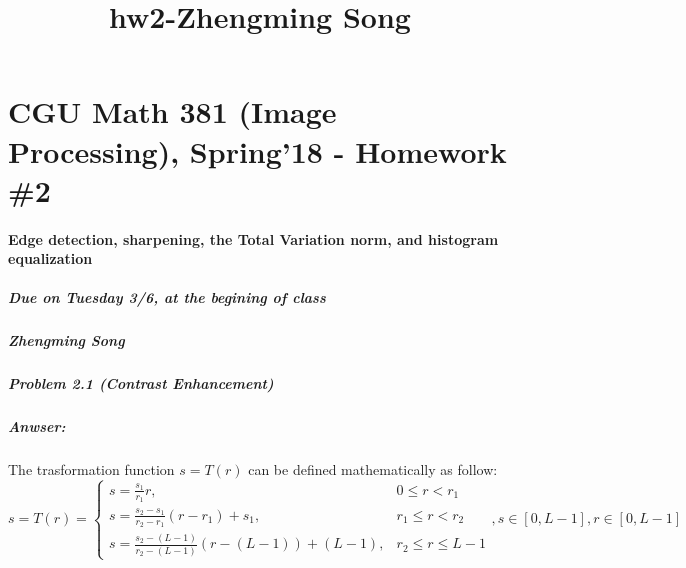 \documentclass[11pt]{article}
\title{hw2-Zhengming Song}
\begin{document}
    
    
    \maketitle
    
    

    
    \section{CGU Math 381 (Image Processing), Spring'18 - Homework
\#2}\label{cgu-math-381-image-processing-spring18---homework-2}

\paragraph{Edge detection, sharpening, the Total Variation norm, and
histogram
equalization}\label{edge-detection-sharpening-the-total-variation-norm-and-histogram-equalization}

\subparagraph{Due on Tuesday 3/6, at the begining of
class}\label{due-on-tuesday-36-at-the-begining-of-class}

\subparagraph{Zhengming Song}\label{zhengming-song}

    \subparagraph{\texorpdfstring{\textbf{Problem 2.1} (Contrast
Enhancement)}{Problem 2.1 (Contrast Enhancement)}}\label{problem-2.1-contrast-enhancement}

    \subparagraph{\texorpdfstring{\textbf{Anwser:}}{Anwser:}}\label{anwser}

The trasformation function \(s=T(r)\) can be defined mathematically as
follow: \[ 
s=T(r) =
\begin{cases}
s = \frac{s_1}{r_1} r, & 0\le r < r_1\\
s = \frac{s_2-s_1}{r_2-r_1}(r-r_1)+s_1, & r_1 \le r <r_2 \\
s = \frac{s_2-(L-1)}{r_2-(L-1)}(r-(L-1))+(L-1), & r_2 \le r \le L-1
\end{cases},
s\in [0, L-1], r \in [0, L-1]
\]
\end{document}
